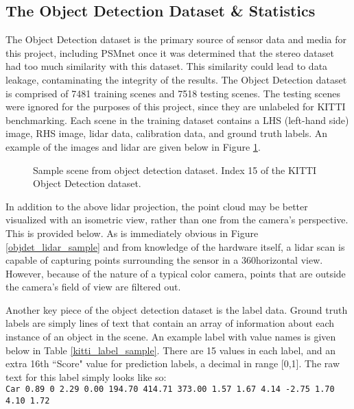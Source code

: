 \subsection{The Object Detection Dataset \& Statistics}
The Object Detection dataset is the primary source of sensor data and media for this project, including PSMnet once it was determined that the stereo dataset had too much similarity with this dataset. This similarity could lead to data leakage, contaminating the integrity of the results. The Object Detection dataset is comprised of 7481 training scenes and 7518 testing scenes. The testing scenes were ignored for the purposes of this project, since they are unlabeled for KITTI benchmarking. Each scene in the training dataset contains a LHS (left-hand side) image, RHS image, lidar data, calibration data, and ground truth labels. An example of the images and lidar are given below in Figure \ref{objdet_sample}.

\begin{figure}[H]
    \centering
    \caption{Sample scene from object detection dataset. Index 15 of the KITTI Object Detection dataset.}
    \label{objdet_sample}
\end{figure}

In addition to the above lidar projection, the point cloud may be better visualized with an isometric view, rather than one from the camera's perspective. This is provided below. As is immediately obvious in Figure \ref{objdet_lidar_sample} and from knowledge of the hardware itself, a lidar scan is capable of capturing points surrounding the sensor in a 360\deg horizontal view. However, because of the nature of a typical color camera, points that are outside the camera's field of view are filtered out.

Another key piece of the object detection dataset is the label data. Ground truth labels are simply lines of text that contain an array of information about each instance of an object in the scene. An example label with value names is given below in Table \ref{kitti_label_sample}. There are 15 values in each label, and an extra 16th ``Score" value for prediction labels, a decimal in range [0,1]. The raw text for this label simply looks like so: \\
\texttt{Car 0.89 0 2.29 0.00 194.70 414.71 373.00 1.57 1.67 4.14 -2.75 1.70 4.10 1.72} \\

